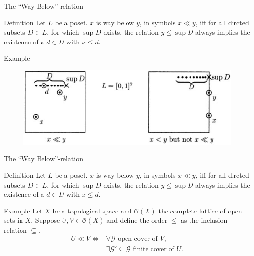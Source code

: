 \documentclass{beamer}
\begin{document}
\begin{frame}{The ``Way Below''-relation}
\begin{block}{Definition}
Let $L$ be a poset. $x$ is way below $y$, in symbols $x \ll y$, iff for all dircted subsets $D \subset L$, for which $\sup D$ exists, the relation $y \leq \sup D$ always implies the existence of a $d \in D$ with $x \leq d$.
\end{block}

\begin{block}{Example}
\begin{figure}
  \centering
  \includegraphics[scale=0.5]{figuurway.jpg}\\
\end{figure}
\end{block}


\end{frame}


\begin{frame}{The ``Way Below''-relation}


\begin{block}{Definition}
Let $L$ be a poset. $x$ is way below $y$, in symbols $x \ll y$, iff for all dircted subsets $D \subset L$, for which $\sup D$ exists, the relation $y \leq \sup D$ always implies the existence of a $d \in D$ with $x \leq d$.
\end{block}
\begin{block}{Example}
Let $X$ be a topological space and $\mathcal{O}(X)$ the complete lattice of open sets in $X$. Suppose $U, V \in \mathcal{O}(X)$ and define the order $\leq$ as the inclusion relation $\subseteq$.
\begin{align*}
 U \ll V \Leftrightarrow &\forall \mathcal{G} \text{ open cover of } V,\\
 &\exists \mathcal{G}' \subseteq \mathcal{G} \text{ finite cover of } U.
\end{align*}
\end{block}
\end{frame}
\end{document}
